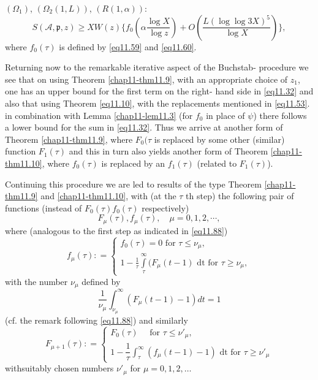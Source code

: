 \begin{theorem}\label{chap11-thm11.11}
$(\Omega_1)$, $(\Omega_ 2(1,L))$, $(R(1, \alpha))$:
\begin{equation*}
S(\mathscr{A},\mathfrak{p},z)\geqslant X W (z) \bigg\{ f_0 (\alpha
\frac{\log X}{\log z})+O(\frac{L (\log \log 3 X)^5}{\log X})\bigg\},
\tag{11.64}\label{eq11.64} 
\end{equation*}\pageoriginale
where  $f_0(\tau)$ is defined by \eqref{eq11.59} and \eqref{eq11.60}.
\end{theorem}

Returning now to the remarkable  iterative aspect of the Buchstab-
procedure we see that on using Theorem \ref{chap11-thm11.9}, 
with an appropriate\break
choice of $z_1$, one has an upper bound for the first term on the
right- hand side in \eqref{eq11.32} and also that using Theorem
\eqref{eq11.10}, with the replacements mentioned in
\eqref{eq11.53}. in combination with 
Lemma \ref{chap11-lem11.3} 
(for $f_0$ in place of $ \psi $) there follows a lower
bound for the sum in \eqref{eq11.32}. Thus we arrive at another form of
Theorem \ref{chap11-thm11.9}, where $F_0 (\tau$ is  replaced by some
other (similar) function $F_1(\tau)$ and this  in turn also yields
another form of 
Theorem \ref{chap11-thm11.10}, where $f_0 (\tau)$  is replaced by an 
$f_1 (\tau )$ (related to $F_1(\tau)$). 

Continuing this procedure we are led to results of the type Theorem
\ref{chap11-thm11.9} and \ref{chap11-thm11.10}, with (at the $\tau$ th
step) the following pair of functions (instead of $F_0 (\tau) f_0
(\tau)$ respectively)  
\begin{equation*}
F_\mu (\tau), f_\mu (\tau ), \quad \mu =0,1,2,\cdots,
\tag{11.65}\label{eq11.65} 
\end{equation*} 
where (analogous to the first step as indicated in \eqref{eq11.88})
\begin{equation*}
f_{\mu} (\tau): =
\begin{cases}
f_0 (\tau )= 0 \text{ for } \tau \leq \nu_\mu,  \\1- \frac{1}{\tau}
\int\limits_\tau ^\infty (F_\mu (t-1) \text { dt for } \tau \geq \nu
_\mu, 
\end{cases}\tag{11.66}\label{eq11.66} 
\end{equation*}
with the number $\nu _\mu$ defined by 
\begin{equation*}
\frac{1}{\nu_\mu}\int^{\infty}_ {\nu_{\mu}} (F_\mu (t-1) -1)  dt =1
\tag{11.67}\label{eq11.67} 
\end{equation*}
(cf. the remark following \eqref{eq11.88}) and similarly
 \begin{equation*}
F_{\mu +1}(\tau): = 
\begin{cases}
F_0 (\tau) \quad \text{ for } \tau \leq \nu '_\mu , \\
1- \dfrac{1}{\tau}  \int^{\infty}_{\tau}(f _\mu (t-1)-1) \text{ dt
  for }  \tau \ge  \nu ' _\mu 
\end{cases}\tag{11.68} \label{eq11.68}
 \end{equation*} 
with\pageoriginale suitably chosen numbers $\nu'_\mu$ for $\mu =
0,1,2,\ldots$  

